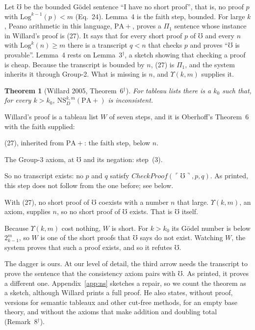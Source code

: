 \documentclass[11pt]{article}
\newcommand{\contra}{~\text{\Lightning}}  %
\newcommand{\gn}[1]{\ulcorner #1\urcorner}  %
\newcommand{\Mho}{\mho}                     %
\newcommand{\sk}{\ensuremath{^\dagger}}    %
\theoremstyle{plain}
\newtheorem{theorem}{Theorem}
\theoremstyle{definition}
\begin{document}
Let $\Mho$ be the bounded Gödel sentence ``I have no short proof'', that is,
no proof $p$ with $\mathrm{Log}^{k-1}(p) < m$ (Eq.~24). Lemma~4 is the faith
step, bounded. For large $k$, Peano arithmetic in this language,
$\mathrm{PA}{+}$, proves a $\Pi_1$ sentence whose instance in Willard's proof
is (27). It says that for every short proof $p$ of $\Mho$ and every $n$ with
$\mathrm{Log}^k(n) \ge m$ there is a transcript $q < n$ that checks $p$ and
proves ``$\Mho$ is provable''.
Lemma~4 rests on Lemma~3\sk, a sketch showing that checking a proof is
cheap. Because the transcript is bounded by $n$, (27) is $\Pi_1$, and the
system inherits it through Group-2. What is missing is $n$, and
$\Upsilon(k,m)$ supplies it.

\begin{theorem}[Willard 2005, Theorem~6\sk]\label{thm:ns}
For tableau lists there is a $k_0$ such that, for every $k > k_0$,
$\mathrm{NS}^{k,m}_D(\mathrm{PA}{+})$ is inconsistent.
\end{theorem}

\noindent
Willard's proof is a tableau list $W$ of seven steps, and it is Oberhoff's
Theorem~6 with the faith supplied:
\begin{topsteps}
\item (27), inherited from $\mathrm{PA}{+}$: the faith step, below $n$.
\item The Group-3 axiom, at $\Mho$ and its negation: step~(3).
\item So no transcript exists: no $p$ and $q$ satisfy
  $\mathit{CheckProof}(\gn{\Mho}, p, q)$. As printed, this step does not
  follow from the one before; see below.
\item With (27), no short proof of $\Mho$ coexists with a number $n$ that
  large. $\Upsilon(k,m)$, an axiom, supplies $n$, so no short proof of $\Mho$
  exists. That is $\Mho$ itself.
\item Because $\Upsilon(k,m)$ cost nothing, $W$ is short. For $k > k_0$ its
  Gödel number is below $2^m_{k-1}$, so $W$ is one of the short proofs that
  $\Mho$ says do not exist. Watching $W$, the system proves that such a proof
  exists, and so it refutes $\Mho$.\contra
\end{topsteps}

\noindent
The dagger is ours. At our level of detail, the third arrow needs the
transcript to prove the sentence that the consistency axiom pairs with
$\Mho$. As printed, it proves a different one.
Appendix~\ref{app:ns} sketches a repair, so we count the theorem as a sketch,
although Willard prints a full proof. He also states, without proof,
versions for semantic tableaux and other cut-free methods, for an empty base
theory, and without the axioms that make addition and doubling total
(Remark~8\sk).
\end{document}
